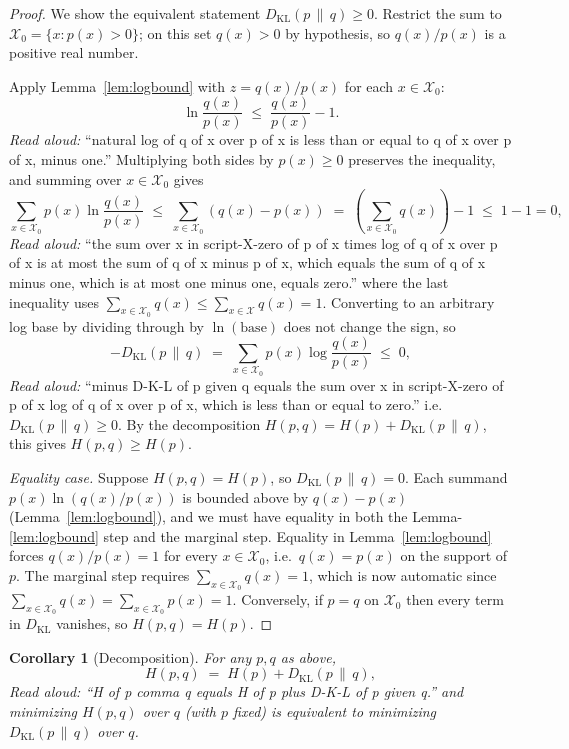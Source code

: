 \documentclass[11pt]{article}
\newtheorem{corollary}[theorem]{Corollary}
\theoremstyle{definition}
\newcommand{\KL}{D_{\mathrm{KL}}}
\newcommand{\X}{\mathcal{X}}
\begin{document}
\begin{proof}
We show the equivalent statement $\KL(p \,\|\, q) \ge 0$. Restrict the sum to
$\X_0 = \{x : p(x) > 0\}$; on this set $q(x) > 0$ by hypothesis, so
$q(x)/p(x)$ is a positive real number.

Apply Lemma~\ref{lem:logbound} with $z = q(x)/p(x)$ for each $x \in \X_0$:
\[
  \ln \frac{q(x)}{p(x)} \;\le\; \frac{q(x)}{p(x)} - 1.
\]
\emph{Read aloud:} ``natural log of q of x over p of x is less than or equal to
q of x over p of x, minus one.''
Multiplying both sides by $p(x) \ge 0$ preserves the inequality, and summing
over $x \in \X_0$ gives
\[
  \sum_{x \in \X_0} p(x) \ln \frac{q(x)}{p(x)}
  \;\le\;
  \sum_{x \in \X_0} \left( q(x) - p(x) \right)
  \;=\; \left( \sum_{x \in \X_0} q(x) \right) - 1
  \;\le\; 1 - 1 = 0,
\]
\emph{Read aloud:} ``the sum over x in script-X-zero of p of x times log of q of
x over p of x is at most the sum of q of x minus p of x, which equals the sum
of q of x minus one, which is at most one minus one, equals zero.''
where the last inequality uses $\sum_{x \in \X_0} q(x) \le \sum_{x \in \X} q(x) = 1$.
Converting to an arbitrary log base by dividing through by $\ln(\text{base})$ does
not change the sign, so
\[
  -\KL(p \,\|\, q) \;=\; \sum_{x \in \X_0} p(x) \log \frac{q(x)}{p(x)} \;\le\; 0,
\]
\emph{Read aloud:} ``minus D-K-L of p given q equals the sum over x in
script-X-zero of p of x log of q of x over p of x, which is less than or equal
to zero.''
i.e.\ $\KL(p \,\|\, q) \ge 0$. By the decomposition
$H(p, q) = H(p) + \KL(p \,\|\, q)$, this gives $H(p, q) \ge H(p)$.

\medskip
\emph{Equality case.} Suppose $H(p, q) = H(p)$, so $\KL(p \,\|\, q) = 0$.
Each summand $p(x) \ln(q(x)/p(x))$ is bounded above by $q(x) - p(x)$
(Lemma~\ref{lem:logbound}), and we must have equality in both the
Lemma-\ref{lem:logbound} step and the marginal step. Equality in
Lemma~\ref{lem:logbound} forces $q(x)/p(x) = 1$ for every $x \in \X_0$, i.e.\
$q(x) = p(x)$ on the support of $p$. The marginal step requires
$\sum_{x \in \X_0} q(x) = 1$, which is now automatic since
$\sum_{x \in \X_0} q(x) = \sum_{x \in \X_0} p(x) = 1$. Conversely, if $p = q$ on
$\X_0$ then every term in $\KL$ vanishes, so $H(p, q) = H(p)$.
\end{proof}

\begin{corollary}[Decomposition]
For any $p, q$ as above,
\[
  H(p, q) \;=\; H(p) + \KL(p \,\|\, q),
\]
\emph{Read aloud:} ``H of p comma q equals H of p plus D-K-L of p given q.''
and minimizing $H(p, q)$ over $q$ (with $p$ fixed) is equivalent to minimizing
$\KL(p \,\|\, q)$ over $q$.
\end{corollary}
\end{document}
